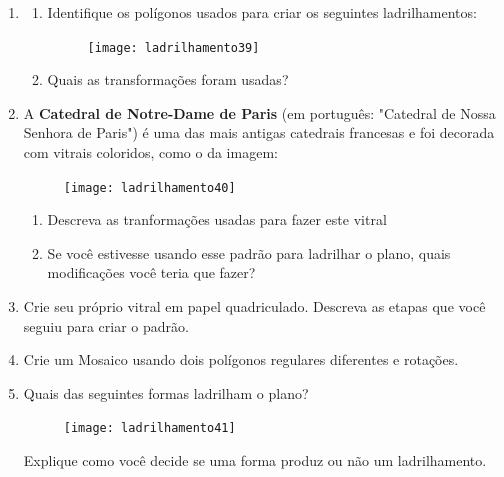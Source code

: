 \exercise
\begin{enumerate}
	\item
	\begin{enumerate}
	\item Identifique os polígonos usados para criar os seguintes ladrilhamentos:
	\begin{figure}[H]
	\centering
	\texttt{[image: ladrilhamento39]}

	\end{figure}

	\item Quais as transformações foram usadas?

	\end{enumerate}

	\item A \textbf{Catedral de Notre-Dame de Paris} (em português: "Catedral de Nossa Senhora de Paris") é uma das mais antigas catedrais francesas e foi decorada com vitrais coloridos, como o da imagem:

	\begin{figure}[H]
	\centering
	\texttt{[image: ladrilhamento40]}
	\end{figure}
	
	\begin{enumerate}
		\item Descreva as tranformações usadas para fazer este vitral
		\item Se você estivesse usando esse padrão para ladrilhar o plano, quais modificações você teria que fazer?

	\end{enumerate}

	\item Crie seu próprio vitral em papel quadriculado. Descreva as etapas que você seguiu para criar o padrão.

	\item Crie um Mosaico usando dois polígonos regulares diferentes e rotações.

	\item Quais das seguintes formas ladrilham o plano?

	\begin{figure}[H]
	\centering
	\texttt{[image: ladrilhamento41]}

	\end{figure}
	Explique como você decide se uma forma produz ou não um ladrilhamento.

\end{enumerate}


